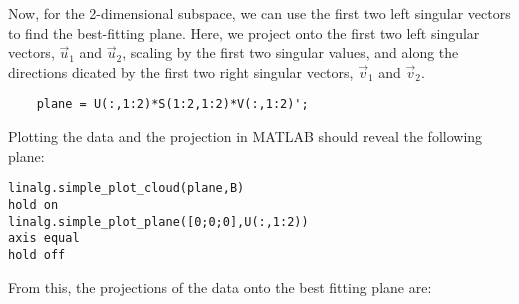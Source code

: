 \documentclass{ximera}
\begin{document}
\begin{problem}
  Now, for the 2-dimensional subspace, we can use the first two left singular vectors to find the best-fitting plane. Here, we project onto the first two left singular vectors, $\vec{u}_1$ and $\vec{u}_2$, scaling by the first two singular values, and along the directions dicated by the first two right singular vectors, $\vec{v}_1$ and $\vec{v}_2$.

  \begin{verbatim}
    plane = U(:,1:2)*S(1:2,1:2)*V(:,1:2)';
  \end{verbatim}

Plotting the data and the projection in MATLAB should reveal the following plane:

  \begin{verbatim}
linalg.simple_plot_cloud(plane,B)
hold on
linalg.simple_plot_plane([0;0;0],U(:,1:2))
axis equal
hold off
  \end{verbatim}

  From this, the projections of the data onto the best fitting plane are: 


\end{problem}
\end{document}
